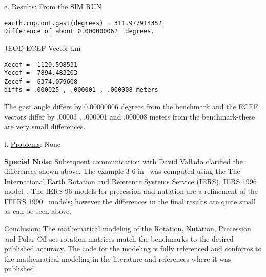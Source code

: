 e. \underline{Results}:\newline
From the SIM RUN
\begin{verbatim}
earth.rnp.out.gast(degrees) = 311.977914352
Difference of about 0.000000062  degrees.
\end{verbatim}

JEOD ECEF Vector {km}
\begin{verbatim}
Xecef = -1120.598531
Yecef =  7894.483203
Zecef =  6374.079608
diffs = .000025 , .000001 , .000008 meters
\end{verbatim}

The gast angle differs by 0.00000006 degrees from the benchmark and the
ECEF vectors differ by .00003 , .000001 and .000008 meters from the benchmark-these are very small differences.\newline

f. \underline{ Problems}:\newline
None

{\bf\underline{Special Note}:} \newline
Subsequent communication with David Vallado clarified the differences shown
above.  The example 3-6 in~\cite{VMcC} was computed using the
The International Earth Rotation and Reference Systems Service (IERS),
IERS 1996 model~\cite{IERS32}. The IERS 96 models for precession and
nutation are a refinement of the ITERS 1990~\cite{IERS13} models; however
the differences in the final results are quite small as can be seen above.

\underline{Conclusion}:\newline
The mathematical modeling of the Rotation, Nutation, Precession and Polar
Off-set rotation matrices match the benchmarks to the desired published
accuracy.  The code for the modeling is fully referenced and conforms to the
mathematical modeling in the literature and references where it was published.

\newpage
\boilerplatetraceability

\newpage
\boilerplatemetrics
